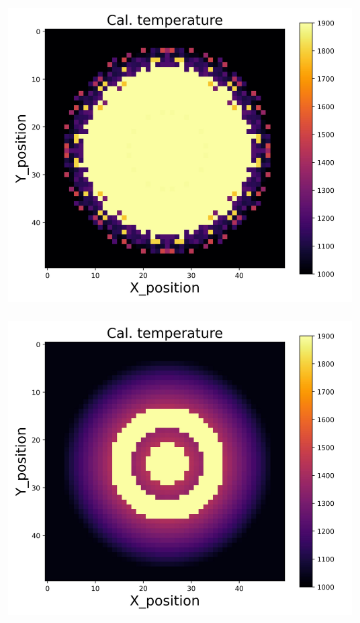 {\begin{figure}[p]
\begin{minipage}{\textwidth}
\begin{subfigure}{0.325\textwidth}
        \end{subfigure}
    \end{minipage}\\
    \begin{minipage}{\textwidth}
        \centering
        \begin{subfigure}{0.325\textwidth}
            \centering
            \includegraphics[width=\textwidth]{figures/raw_data/32/quad/T_cal.jpg}
        \end{subfigure}
        \begin{subfigure}{0.325\textwidth}
            \centering
            \includegraphics[width=\textwidth]{figures/raw_data/33/quad/T_cal.jpg}

\end{subfigure}
\end{minipage}
\end{figure}}
